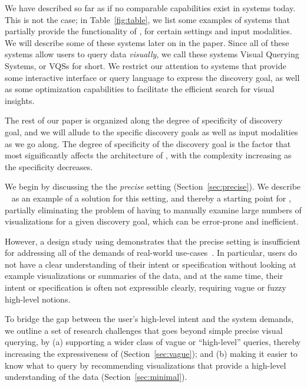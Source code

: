 \par
{}
We have described \vida so far as if no comparable capabilities
exist in systems today.
This is not the case; in Table~\ref{fig:table}, we list some examples of systems
that partially provide the functionality of \vida,
for certain settings and input modalities.
We will describe some of these systems later on in the paper. 
Since all of these systems allow users to query data {\em visually},
we call these systems Visual Querying Systems, or VQSs for short.
We restrict our attention to systems that provide 
some interactive interface or query language to express
the discovery goal, as well as
some optimization capabilities to facilitate the 
efficient search for visual insights. 


\par
{}
The rest of our paper is organized along the degree of specificity
of discovery goal, and we will allude to the specific discovery
goals as well as input modalities as we go along. 
The degree of specificity of the discovery goal is the factor
that most significantly affects the architecture of \vida,
with the complexity increasing as the specificity decreases. 

\par We begin by discussing the 
the {\em precise} setting (Section~\ref{sec:precise}).
We describe \zv~\cite{Siddiqui2016} 
as an example of a solution for
this setting, and thereby a starting point for \vida,
partially eliminating the problem
of having to manually examine large numbers 
of visualizations for a given discovery goal, 
which can be error-prone and inefficient.


\par However, a design study using \zv demonstrates
that the precise setting is insufficient for
addressing all of the demands of real-world use-cases~\cite{Lee2017}.
In particular, users do not have
a clear understanding of their intent or specification 
without looking
at example visualizations or summaries of the data,
and at the same time, their intent or specification is
often not expressible clearly, requiring 
vague or fuzzy high-level notions.

To bridge the gap between the user's high-level
intent and the system demands,
we outline a set of research challenges
that goes beyond simple precise visual querying, by
(a) supporting a wider class of vague or ``high-level''
queries, thereby increasing the expressiveness
of \vida (Section~\ref{sec:vague});
and 
(b) making it easier to know what to query
by recommending visualizations that provide
a high-level understanding of the data (Section~\ref{sec:minimal}).

